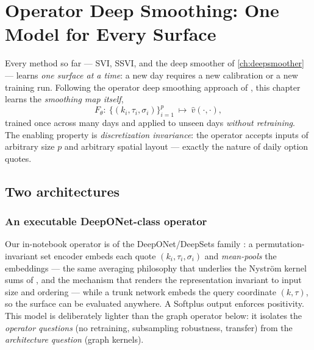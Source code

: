 \chapter{Operator Deep Smoothing: One Model for Every Surface}
\label{ch:operator}

Every method so far --- SVI, SSVI, and the deep smoother of
\cref{ch:deepsmoother} --- learns \emph{one surface at a time}: a new day
requires a new calibration or a new training run. Following the operator
deep smoothing approach of \cite{gonon2024operator}, this chapter learns the
\emph{smoothing map itself},
\begin{equation}
  F_\theta:\ \{(k_i,\tau_i,\sigma_i)\}_{i=1}^{p}\ \longmapsto\
  \hat v(\cdot,\cdot),
  \label{eq:operator}
\end{equation}
trained once across many days and applied to unseen days \emph{without
retraining}. The enabling property is \emph{discretization invariance}: the
operator accepts inputs of arbitrary size $p$ and arbitrary spatial layout
--- exactly the nature of daily option quotes.

\section{Two architectures}
\label{sec:oparch}

\subsection{An executable DeepONet-class operator}
Our in-notebook operator is of the DeepONet/DeepSets family
\cite{lu2021deeponet}: a permutation-invariant set encoder embeds each quote
$(k_i,\tau_i,\sigma_i)$ and \emph{mean-pools} the embeddings --- the same
averaging philosophy that underlies the Nystr\"om kernel sums of
\cite{gonon2024operator}, and the mechanism that renders the representation
invariant to input size and ordering --- while a trunk network embeds the
query coordinate $(k,\tau)$, so the surface can be evaluated anywhere. A
Softplus output enforces positivity. This model is deliberately lighter than
the graph operator below: it isolates the \emph{operator questions}
(no retraining, subsampling robustness, transfer) from the
\emph{architecture question} (graph kernels).

